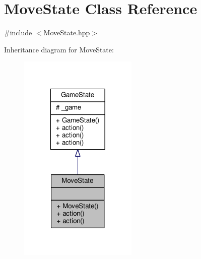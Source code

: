 \hypertarget{class_move_state}{\section{Move\-State Class Reference}
\label{class_move_state}
}


{\ttfamily \#include $<$Move\-State.\-hpp$>$}



Inheritance diagram for Move\-State\-:\nopagebreak
\begin{figure}[H]
\begin{center}
\leavevmode
\includegraphics[width=160pt]{class_move_state__inherit__graph}
\end{center}
\end{figure}


